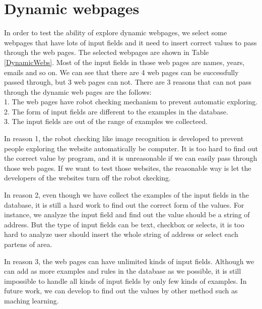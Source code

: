 
\clearpage

\section{Dynamic webpages}

In order to test the ability of explore dynamic webpages,
we select some webpages that have lots of input fields and it need to insert correct values to pass through the web pages.
The selected webpages are shown in Table \ref{DynamicWebs}.
Most of the input fields in those web pages are names, years, emails and so on.
We can see that there are 4 web pages can be successfully passed through, but 3 web pages can not.
There are 3 reasons that can not pass through the dynamic web pages are the follows:
\\	1. The web pages have robot checking mechanism to prevent automatic exploring.
\\	2. The form of input fields are different to the examples in the database.
\\	3. The input fields are out of the range of examples we collecteed.
	
In reason 1, the robot checking like image recognition is developed to prevent people exploring the website automatically be computer.
It is too hard to find out the correct value by program,
and it is unreasonable if we can easily pass through those web pages.
If we want to test those websites,
the reasonable way is let the developers of the websites turn off the robot ckecking.

In reason 2, even though we have collect the examples of the input fields in the database, 
it is still a hard work to find out the correct form of the values.
For instance, we analyze the input field and find out the value should be a string of address.
But the type of input fields can be text, checkbox or selects, 
it is too hard to analyze user should insert the whole string of address or select each partens of area.

In reason 3, the web pages can have unlimited kinds of input fields.
Although we can add as more examples and rules in the database as we possible,
it is still impossible to handle all kinds of input fields by only few kinds of examples.
In future work, we can develop to find out the values by other method such as maching learning.


